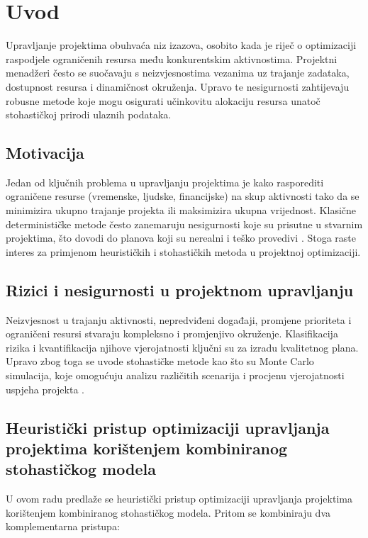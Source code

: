 \section{Uvod}

Upravljanje projektima obuhvaća niz izazova, osobito kada je riječ o optimizaciji raspodjele ograničenih resursa među konkurentskim aktivnostima. Projektni menadžeri često se suočavaju s neizvjesnostima vezanima uz trajanje zadataka, dostupnost resursa i dinamičnost okruženja. Upravo te nesigurnosti zahtijevaju robusne metode koje mogu osigurati učinkovitu alokaciju resursa unatoč stohastičkoj prirodi ulaznih podataka.

\subsection{Motivacija}

Jedan od ključnih problema u upravljanju projektima je kako rasporediti ograničene resurse (vremenske, ljudske, financijske) na skup aktivnosti tako da se minimizira ukupno trajanje projekta ili maksimizira ukupna vrijednost. Klasične determinističke metode često zanemaruju nesigurnosti koje su prisutne u stvarnim projektima, što dovodi do planova koji su nerealni i teško provedivi \cite{Kerzner2017, PMI2021}. Stoga raste interes za primjenom heurističkih i stohastičkih metoda u projektnoj optimizaciji.

\subsection{Rizici i nesigurnosti u projektnom upravljanju}

Neizvjesnost u trajanju aktivnosti, nepredviđeni događaji, promjene prioriteta i ograničeni resursi stvaraju kompleksno i promjenjivo okruženje. Klasifikacija rizika i kvantifikacija njihove vjerojatnosti ključni su za izradu kvalitetnog plana. Upravo zbog toga se uvode stohastičke metode kao što su Monte Carlo simulacija, koje omogućuju analizu različitih scenarija i procjenu vjerojatnosti uspjeha projekta \cite{Vose2008}.

\subsection{Heuristički pristup optimizaciji upravljanja projektima korištenjem kombiniranog stohastičkog modela}

U ovom radu predlaže se heuristički pristup optimizaciji upravljanja projektima korištenjem kombiniranog stohastičkog modela. Pritom se kombiniraju dva komplementarna pristupa:


